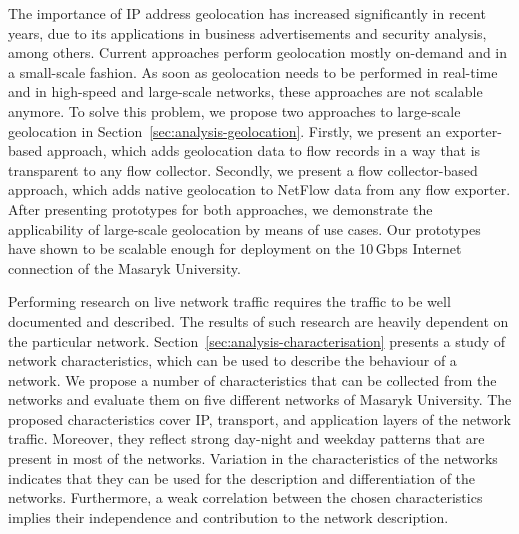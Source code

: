 The importance of IP address geolocation has increased significantly in recent years, due to its applications in business advertisements and security analysis, among others. Current approaches perform geolocation mostly on-demand and in a small-scale fashion. As soon as geolocation needs to be performed in real-time and in high-speed and large-scale networks, these approaches are not scalable anymore. To solve this problem, we propose two approaches to large-scale geolocation in Section~\ref{sec:analysis-geolocation}. Firstly, we present an exporter-based approach, which adds geolocation data to flow records in a way that is transparent to any flow collector. Secondly, we present a flow collector-based approach, which adds native geolocation to NetFlow data from any flow exporter. After presenting prototypes for both approaches, we demonstrate the applicability of large-scale geolocation by means of use cases. Our prototypes have shown to be scalable enough for deployment on the 10\,Gbps Internet connection of the Masaryk University.

Performing research on live network traffic requires the traffic to be well documented and described. The results of such research are heavily dependent on the particular network. Section~\ref{sec:analysis-characterisation} presents a study of network characteristics, which can be used to describe the behaviour of a network. We propose a number of characteristics that can be collected from the networks and evaluate them on five different networks of Masaryk University. The proposed characteristics cover IP, transport, and application layers of the network traffic. Moreover, they reflect strong day-night and weekday patterns that are present in most of the networks. Variation in the characteristics of the networks indicates that they can be used for the description and differentiation of the networks. Furthermore, a weak correlation between the chosen characteristics implies their independence and contribution to the network description.
